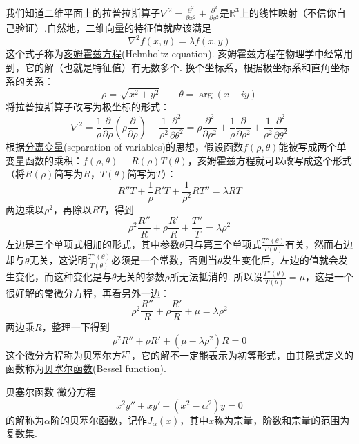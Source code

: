 \documentclass[main.tex]{subfiles}
\begin{document}
我们知道二维平面上的拉普拉斯算子\(\displaystyle{\nabla^2 =\frac{\partial^2}{\partial x^2}+\frac{\partial^2 }{\partial y^2}}\)是\(\mathbb{R}^3\)上的线性映射（不信你自己验证）.自然地，二维向量的特征值就应该满足
\[\nabla^2 f(x,y)=\lambda f(x,y)\]
这个式子称为\uline{亥姆霍兹方程}(Helmholtz equation). 亥姆霍兹方程在物理学中经常用到，它的解（也就是特征值）有无数多个. 换个坐标系，根据极坐标系和直角坐标系的关系：
\[\rho = \sqrt{x^2+y^2} \qquad \theta = \arg(x+iy)\]
将拉普拉斯算子改写为极坐标的形式：
\[\nabla^2 = \frac{1}{\rho}\frac{\partial}{\partial \rho}\left(\rho\frac{\partial}{\partial \rho}\right) + \frac{1}{\rho^2}\frac{\partial^2}{\partial \theta^2} = \rho\frac{\partial^2}{\partial \rho^2} + \frac{1}{\rho}\frac{\partial}{\partial \rho^2} + \frac{1}{\rho^2}\frac{\partial^2}{\partial \theta^2}\]
根据\uline{分离变量}(separation of variables)的思想，假设函数\(f(\rho,\theta)\)能被写成两个单变量函数的乘积：\(f(\rho,\theta)\equiv R(\rho)T(\theta)\)，亥姆霍兹方程就可以改写成这个形式（将\(R(\rho)\)简写为\(R\)，\(T(\theta)\)简写为\(T\)）：
\[R''T+\frac{1}{\rho}R'T+\frac{1}{\rho^2}RT''=\lambda RT\]
两边乘以\(\rho^2\)，再除以\(RT\)，得到
\[\rho^2\frac{R''}{R}+\rho\frac{R'}{R}+\frac{T''}{T}=\lambda\rho^2\]
左边是三个单项式相加的形式，其中参数\(\theta\)只与第三个单项式\(\displaystyle{\frac{T''(\theta)}{T(\theta)}}\)有关，然而右边却与\(\theta\)无关，这说明\(\displaystyle{\frac{T''(\theta)}{T(\theta)}}\)必须是一个常数，否则当\(\theta\)发生变化后，左边的值就会发生变化，而这种变化是与\(\theta\)无关的参数\(\rho\)所无法抵消的. 所以设\(\displaystyle{\frac{T''(\theta)}{T(\theta)} = \mu}\)，这是一个很好解的常微分方程，再看另外一边：
\[\rho^2\frac{R''}{R}+\rho\frac{R'}{R}+\mu=\lambda\rho^2\]
两边乘\(R\)，整理一下得到
\[\rho^2 R''+\rho R'+ (\mu-\lambda\rho^2)R = 0\]
这个微分方程称为\uline{贝塞尔方程}，它的解不一定能表示为初等形式，由其隐式定义的函数称为\uline{贝塞尔函数}(Bessel function).

\begin{definition}{贝塞尔函数}
    微分方程
    \[x^2y″ + xy′ + (x^2-\alpha^2)y = 0\]
    的解称为\(\alpha\)阶的贝塞尔函数，记作\(J_\alpha(x)\)，其中\(x\)称为\uline{宗量}，阶数和宗量的范围为复数集.
\end{definition}
\end{document}
